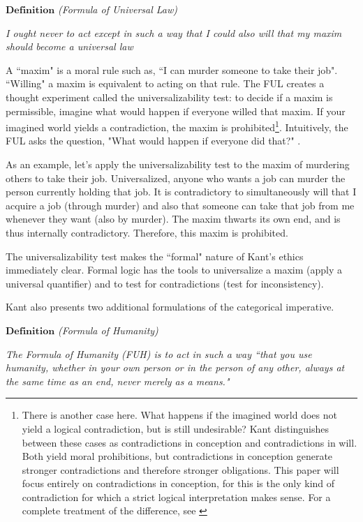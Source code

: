 \begin{isabellebody}
\begin{isamarkuptext}
$\textbf{Definition}$ \emph{(Formula of Universal Law)}

\emph{I ought never to act except in such a way that I could also will that my maxim should become a universal law} \cite{groundwork}

A ``maxim" is a moral rule such as, ``I can murder someone to take their job". ``Willing" a maxim is 
equivalent to acting on that rule. The FUL creates a thought experiment called the universalizability 
test: to decide if a maxim is permissible, imagine what would happen if everyone willed that maxim. 
If your imagined world yields a contradiction, the maxim is prohibited\footnote{There is another case here.
What happens if the imagined world does not yield a logical contradiction, but is still undesirable? Kant 
distinguishes between these cases as contradictions in conception and contradictions in will. Both yield moral
prohibitions, but contradictions in conception generate stronger contradictions and therefore stronger obligations. 
This paper will focus entirely on contradictions in conception, for this is the only kind of contradiction 
for which a strict logical interpretation makes sense. For a complete treatment of the difference, see \cite{groundwork, KorsgaardFUL}}. Intuitively, the FUL asks 
the question, "What would happen if everyone did that?" \cite{KorsgaardFUL}. 

As an example, let's apply the universalizability test to the maxim of murdering others to take their job.
Universalized, anyone who wants a job can murder the person currently holding that job. It is contradictory
to simultaneously will that I acquire a job (through murder) and also that someone can take that job from me 
whenever they want (also by murder). The maxim thwarts its own end, and is thus internally contradictory.
 Therefore, this maxim is prohibited.

The universalizability test makes the ``formal" nature of Kant's ethics immediately clear. Formal 
logic has the tools to universalize a maxim (apply a universal quantifier) and to test for 
contradictions (test for inconsistency). 

Kant also presents two additional formulations of the categorical imperative. 

$\textbf{Definition}$ \emph{(Formula of Humanity)}

\emph{The Formula of Humanity (FUH)
is to act in such a way ``that you use humanity, whether in your own person or in the person
of any other, always at the same time as an end, never merely as a means."}\cite{groundwork}


\end{isamarkuptext}
\end{isabellebody}
